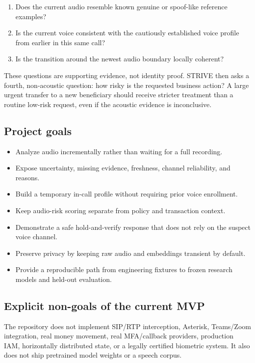 \documentclass[10pt,a4paper]{article}
\begin{document}
\begin{enumerate}
\item Does the current audio resemble known genuine or spoof-like reference examples?
\item Is the current voice consistent with the cautiously established voice profile from earlier in this same call?
\item Is the transition around the newest audio boundary locally coherent?
\end{enumerate}

These questions are supporting evidence, not identity proof. STRIVE then asks a fourth, non-acoustic question: how risky is the requested business action? A large urgent transfer to a new beneficiary should receive stricter treatment than a routine low-risk request, even if the acoustic evidence is inconclusive.

\subsection{Project goals}

\begin{itemize}
\item Analyze audio incrementally rather than waiting for a full recording.
\item Expose uncertainty, missing evidence, freshness, channel reliability, and reasons.
\item Build a temporary in-call profile without requiring prior voice enrollment.
\item Keep audio-risk scoring separate from policy and transaction context.
\item Demonstrate a safe hold-and-verify response that does not rely on the suspect voice channel.
\item Preserve privacy by keeping raw audio and embeddings transient by default.
\item Provide a reproducible path from engineering fixtures to frozen research models and held-out evaluation.
\end{itemize}

\subsection{Explicit non-goals of the current MVP}

The repository does not implement SIP/RTP interception, Asterisk, Teams/Zoom integration, real money movement, real MFA/callback providers, production IAM, horizontally distributed state, or a legally certified biometric system. It also does not ship pretrained model weights or a speech corpus.
\end{document}
